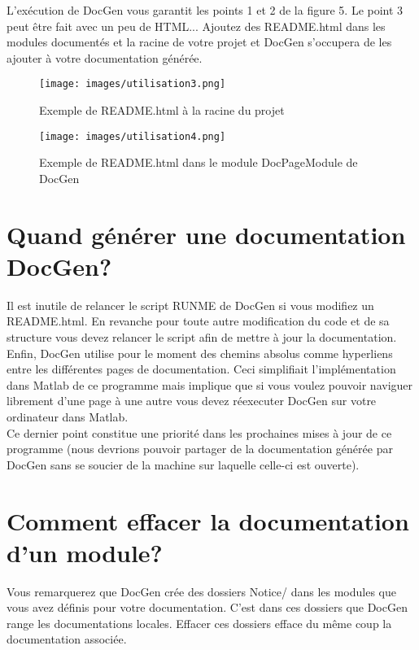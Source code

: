 \documentclass[./standalone.tex]{subfiles}
\begin{document}
L'exécution de DocGen vous garantit les points 1 et 2 de la figure 5. Le point 3 peut être fait avec un peu de HTML... Ajoutez des README.html dans les modules documentés et la racine de votre projet et DocGen s'occupera de les ajouter à votre documentation générée.\\


\begin{figure}[h!]
    \centering
    \texttt{[image: images/utilisation3.png]}
    \caption{Exemple de README.html à la racine du projet}
    \label{fig:Homepage_DocGen}
\end{figure}


\begin{figure}[h!]
    \centering
    \texttt{[image: images/utilisation4.png]}
    \caption{Exemple de README.html dans le module DocPageModule de DocGen}
    \label{fig:Homepage_DocGen}
\end{figure}
\newpage


\section{Quand générer une documentation DocGen?}
Il est inutile de relancer le script RUNME de DocGen si vous modifiez un README.html. En revanche pour toute autre modification du code et de sa structure vous devez relancer le script afin de mettre à jour la documentation.\\

Enfin, DocGen utilise pour le moment des chemins absolus comme hyperliens entre les différentes pages de documentation. Ceci simplifiait l'implémentation dans Matlab de ce programme mais implique que si vous voulez pouvoir naviguer librement d'une page à une autre vous devez réexecuter DocGen sur votre ordinateur dans Matlab.\\

Ce dernier point constitue une priorité dans les prochaines mises à jour de ce programme (nous devrions pouvoir partager de la documentation générée par DocGen sans se soucier de la machine sur laquelle celle-ci est ouverte).\\

\section{Comment effacer la documentation d'un module?}
Vous remarquerez que DocGen crée des dossiers Notice/ dans les modules que vous avez définis pour votre documentation. C'est dans ces dossiers que DocGen range les documentations locales. Effacer ces dossiers efface du même coup la documentation associée.
\end{document}
